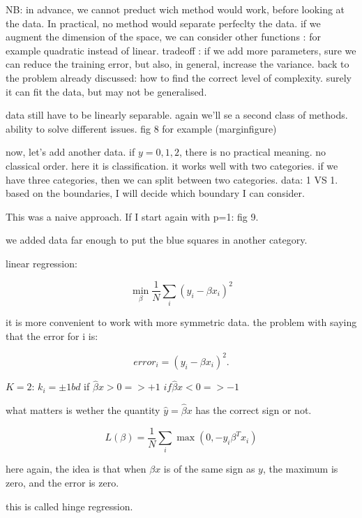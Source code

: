 \documentclass[a4paper]{tufte-book}
\begin{document}
NB: in advance, we cannot preduct wich method would work, before looking at the
data. In practical, no method would separate perfeclty the data.
if we augment the dimension of the space, we can consider other functions : for
example quadratic instead of linear.
tradeoff : if we add more parameters, sure we can reduce the training error, but
also, in general, increase the variance.
back to the problem already discussed: how to find the correct level of
complexity. surely it can fit the data, but may not be generalised.

data still have to be linearly separable.
again we'll se a second class of methods. ability to solve different issues.
fig 8 for example (marginfigure)

now, let's add another data.
if $y= 0,1,2$, there is no practical meaning. no classical order. here it is
classification.
it works well with two categories. if we have three categories, then we can
split between two categories. data: 1 VS 1.
based on the boundaries, I will decide which boundary I can consider.


This was a naive approach. If I start again with p=1:
fig 9.

we added data far enough to put the blue squares in another category.

linear regression:

\begin{equation}
    \min_\beta \frac{1}{N} \sum_i (y_i - \beta x_i)^2
\end{equation}

it is more convenient to work with more symmetric data.
the problem with saying that the error for i is:

\begin{equation}
    error_i = (y_i - \beta x_i)^2.
\end{equation}

$K=2$: $k_i = \pm 1 bd$ if $\hat \beta x >0 => +1$
$if \hat \beta x<0 => -1$

what matters is wether the quantity $\hat y = \hat \beta x$ has the correct sign
or not.

\begin{equation}
    L(\beta) = \frac{1}{N} \sum_i \max(0, -y_i\beta^T x_i)
\end{equation}

here again, the idea is that when $\beta x$ is of the same sign as $y$, the maximum
is zero, and the error is zero.

this is called hinge regression.
\end{document}
